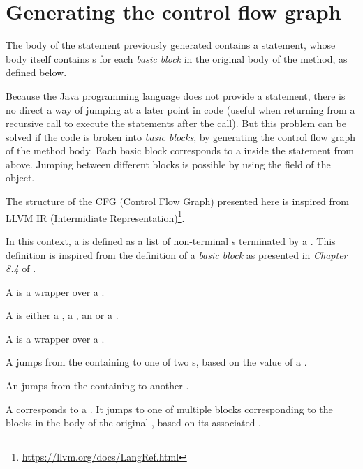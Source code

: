 \section{Generating the control flow graph}

The body of the  statement previously generated contains a  statement, whose body itself
contains s for each \textit{basic block} in the original body of the method, as defined below.

Because the Java programming language does not provide a  statement, there is no direct a way of jumping at
a later point in code (useful when returning from a recursive call to execute the statements after the call). But this
problem can be solved if the code is broken into \textit{basic blocks}, by generating the control flow graph of the
method body. Each basic block corresponds to a  inside the  statement from above. Jumping
between different blocks is possible by using the  field of the  object.

The structure of the CFG (Control Flow Graph)  presented here is inspired from LLVM
IR (Intermidiate Representation)\footnote{\url{https://llvm.org/docs/LangRef.html}}.

In this context, a  is defined as a list of non-terminal s terminated by a
. This definition is inspired from the definition of a \textit{basic block} as presented in
\textit{Chapter 8.4} of \cite{aho}.

A  is a wrapper over a .

A  is either a , a , an
 or a .

A  is a wrapper over a .

A  jumps from the containing  to one of two s, based on the
value of a .

An  jumps from the containing  to another .

A  corresponds to a . It jumps to one of multiple blocks corresponding to
the blocks in the body of the original , based on its associated .

